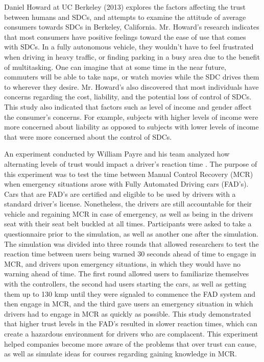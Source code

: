 \documentclass[runningheads,a4paper]{llncs}
\begin{document}
Daniel Howard at UC Berkeley (2013) \cite{howard2014public} explores the factors affecting the trust between humans and SDCs, and attempts to examine the attitude of average consumers towards SDCs in Berkeley, California. Mr. Howard's research indicates that most consumers have positive feelings toward the ease of use that comes with SDCs. In a fully autonomous vehicle, they wouldn't have to feel frustrated when driving in heavy traffic, or finding parking in a busy area due to the benefit of multitasking. One can imagine that at some time in the near future, commuters will be able to take naps, or watch movies while the SDC drives them to wherever they desire. Mr. Howard's also discovered that most individuals have concerns regarding the cost, liability, and the potential loss of control of SDCs. This study also indicated that factors such as level of income and gender affect the consumer's concerns. For example, subjects with higher levels of income were more concerned about liability as opposed to subjects with lower levels of income that were more concerned about the control of SDCs.

An experiment  conducted by William Payre and his team analyzed how alternating levels of trust would impact a driver's reaction time \cite{payre2016fully}.  The purpose of this experiment was to test the time between Manual Control Recovery (MCR) when emergency situations arose with Fully Automated Driving cars (FAD's).  Cars that are FAD's are certified and eligible to be used by drivers with a standard driver's license.  Nonetheless, the drivers are still accountable for their vehicle and regaining MCR in case of emergency, as well as being in the drivers seat with their seat belt buckled at all times.  Participants were asked to take a questionnaire prior to the simulation, as well as another one after the simulation.  The simulation was divided into three rounds that allowed researchers to test the reaction time between users being warned 30 seconds ahead of time to engage in MCR, and drivers upon emergency situations, in which they would have no warning ahead of time.  The first round allowed users to familiarize themselves with the controllers, the second had users starting the cars, as well as getting them up to 130 kmp until they were signaled to commence the FAD system and then engage in MCR, and the third gave users an emergency situation in which drivers had to engage in MCR as quickly as possible.  This study demonstrated that higher trust levels in the FAD's resulted in slower reaction times, which can create a hazardous environment for drivers who are complacent.  This experiment helped companies become more aware of the problems that over trust can cause, as well as simulate ideas for courses regarding gaining knowledge in MCR.
\end{document}

